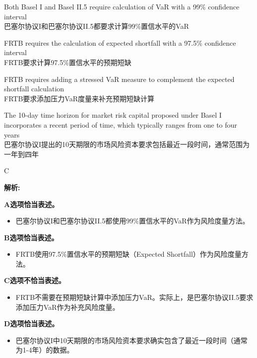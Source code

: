 \documentclass{article}
\newenvironment{explanation}
{\textbf{解析:}\par}
{\par}
\begin{document}
    \begin{choices}
        \item Both Basel I and Basel II.5 require calculation of VaR with a 99\% confidence interval\\
        巴塞尔协议I和巴塞尔协议II.5都要求计算99\%置信水平的VaR
        \item FRTB requires the calculation of expected shortfall with a 97.5\% confidence interval\\
        FRTB要求计算97.5\%置信水平的预期短缺
        \item FRTB requires adding a stressed VaR measure to complement the expected shortfall calculation\\
        FRTB要求添加压力VaR度量来补充预期短缺计算
        \item The 10-day time horizon for market risk capital proposed under Basel I incorporates a recent period of time, which typically ranges from one to four years\\
        巴塞尔协议I提出的10天期限的市场风险资本要求包括最近一段时间，通常范围为一年到四年
    \end{choices}
    
    \begin{correctanswer}
        C
    \end{correctanswer}
    
    \begin{explanation}
        \textbf{A选项恰当表述。}
        \begin{itemize}
            \item 巴塞尔协议I和巴塞尔协议II.5都使用99\%置信水平的VaR作为风险度量方法。
        \end{itemize}
        
        \textbf{B选项恰当表述。}
        \begin{itemize}
            \item FRTB使用97.5\%置信水平的预期短缺（Expected Shortfall）作为风险度量方法。
        \end{itemize}
        
        \textbf{C选项不恰当表述。}
        \begin{itemize}
            \item FRTB不需要在预期短缺计算中添加压力VaR。实际上，是巴塞尔协议II.5要求添加压力VaR作为补充风险度量。
        \end{itemize}
        
        \textbf{D选项恰当表述。}
        \begin{itemize}
            \item 巴塞尔协议I中10天期限的市场风险资本要求确实包含了最近一段时间（通常为1-4年）的数据。
        \end{itemize}
    \end{explanation}
    
\end{document}
